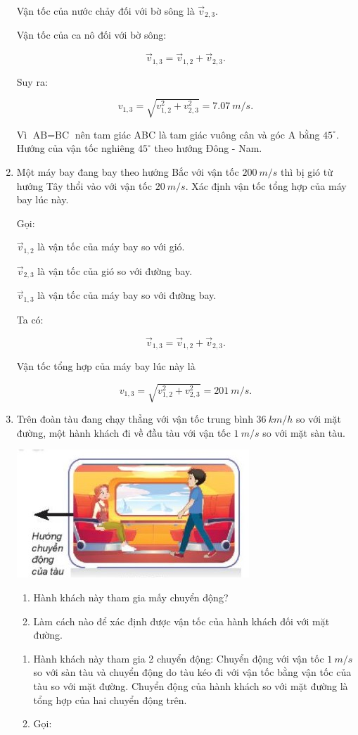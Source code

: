\begin{enumerate}[label=\bfseries Câu \arabic*:]
{		Vận tốc của nước chảy đối với bờ sông là $\vec v_{2,3}$. 
		
		Vận tốc của ca nô đối với bờ sông:
		
		$$\vec v_{1,3} = \vec v_{1,2} + \vec v_{2,3}.$$
		
		Suy ra:
		
		$$v_{1,3} = \sqrt{ v_{1,2}^2 + v_{2,3}^2} = \SI{7,07}{m/s}.$$
		
		Vì $\text{AB} = \text{BC}$ nên tam giác ABC là tam giác vuông cân và góc A bằng $45^\circ$. Hướng của vận tốc nghiêng $45^\circ$ theo hướng Đông - Nam.
	}
	\item {}
	
	\cauhoi
	{
		Một máy bay đang bay theo hướng Bắc với vận tốc $\SI{200}{m/s}$ thì bị gió từ hướng Tây thổi vào với vận tốc $\SI{20}{m/s}$. Xác định vận tốc tổng hợp của máy bay lúc này.
	}
	\loigiai
	{
		Gọi:
		
		$\vec v_{1,2}$ là vận tốc của máy bay so với gió.
		
		$\vec v_{2,3}$ là vận tốc của gió so với đường bay.

		$\vec v_{1,3}$ là vận tốc của máy bay so với đường bay.
		
		Ta có:
		
		$$\vec v_{1,3} = \vec v_{1,2} + \vec v_{2,3}.$$
		
		Vận tốc tổng hợp của máy bay lúc này là
		
		$$v_{1,3} = \sqrt{v_{1,2}^2 + v^2_{2,3}} = \SI{201}{m/s}.$$
	}
		\item {}
	
	\cauhoi
	{
		Trên đoàn tàu đang chạy thẳng với vận tốc trung bình $\SI{36}{km/h}$ so với mặt đường, một hành khách đi về đầu tàu với vận tốc $\SI{1}{m/s}$ so với mặt sàn tàu.
		\begin{center}
			\includegraphics[scale=1]{../figs/VN10-2022-PH-TP005-3.jpg}
		\end{center}
		\begin{enumerate}[label=\alph*)]
			\item Hành khách này tham gia mấy chuyển động?
			\item Làm cách nào để xác định được vận tốc của hành khách đối với mặt đường.
		\end{enumerate}
	}
	\loigiai
	{
		\begin{enumerate}[label=\alph*)]
			\item Hành khách này tham gia 2 chuyển động: Chuyển động với vận tốc $\SI{1}{m/s}$ so với sàn tàu và chuyển động do tàu kéo đi với vận tốc bằng vận tốc của tàu so với mặt đường. Chuyển động của hành khách so với mặt đường là tổng hợp của hai chuyển động trên.
			\item Gọi:
			

\end{enumerate}}
\end{enumerate}

